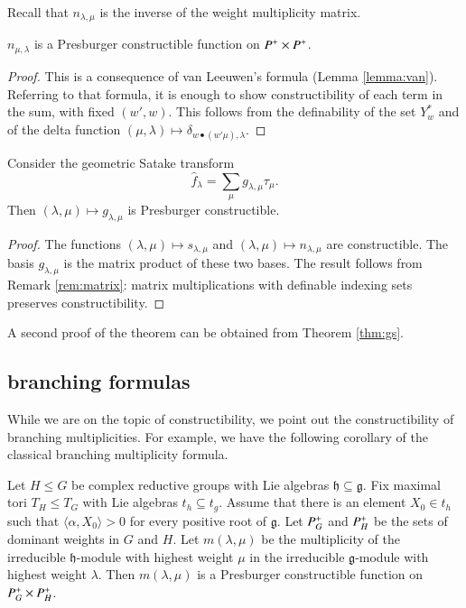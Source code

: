Recall that $n_{\lambda,\mu}$ is the inverse of the weight
multiplicity matrix.

\begin{theorem}\label{lemma:van-leeuwen} 
  $n_{\mu,\lambda}$ is a Presburger constructible function on
  $P^+\times P^+$.
\end{theorem}

\begin{proof} 
  This is a consequence of van Leeuwen's formula (Lemma
  \ref{lemma:van}).  Referring to that formula, it is enough to show
  constructibility of each term in the sum, with fixed $(w',w)$.  This
  follows from the definability of the set $Y^*_w$ and of the delta
  function $(\mu,\lambda)\mapsto \delta_{w\bullet (w'\mu),\lambda}$.
\end{proof}

\begin{corollary} 
  Consider the geometric Satake transform
\[
\hat f_\lambda = \sum_\mu g_{\lambda,\mu} \tau_\mu.
\]
Then $(\lambda,\mu)\mapsto g_{\lambda,\mu}$ is Presburger
constructible.
\end{corollary}

\begin{proof}  
  The functions $(\lambda,\mu)\mapsto s_{\lambda,\mu}$ and
  $(\lambda,\mu)\mapsto n_{\lambda,\mu}$ are constructible.  The basis
  $g_{\lambda,\mu}$ is the matrix product of these two bases.  The
  result follows from Remark \ref{rem:matrix}: matrix multiplications
  with definable indexing sets preserves constructibility.
\end{proof}

A second proof of the theorem can be obtained from Theorem \ref{thm:gs}.

\subsection{branching formulas}

While we are on the topic of constructibility, we point out the
constructibility of branching multiplicities.  For example, we have
the following corollary of the classical branching multiplicity formula.


\begin{lemma} 
  Let $H\le G$ be complex reductive groups with Lie algebras
  ${\mathfrak h}\subseteq {\mathfrak g}$.  Fix maximal tori $T_H\le
  T_G$ with Lie algebras $t_h\subseteq t_g$.  Assume that there is an
  element $X_0\in t_h$ such that $\langle\alpha,X_0\rangle>0$ for
  every positive root of ${\mathfrak g}$.  Let $P^+_G$ and $P^+_H$
  be the sets of dominant weights in $G$ and $H$.  Let
  $m(\lambda,\mu)$ be the multiplicity of the irreducible $\mathfrak
  h$-module with highest weight $\mu$ in the irreducible $\mathfrak
  g$-module with highest weight $\lambda$.  Then $m(\lambda,\mu)$ is a
  Presburger constructible function on $P^+_G\times P^+_H$.
\end{lemma}


